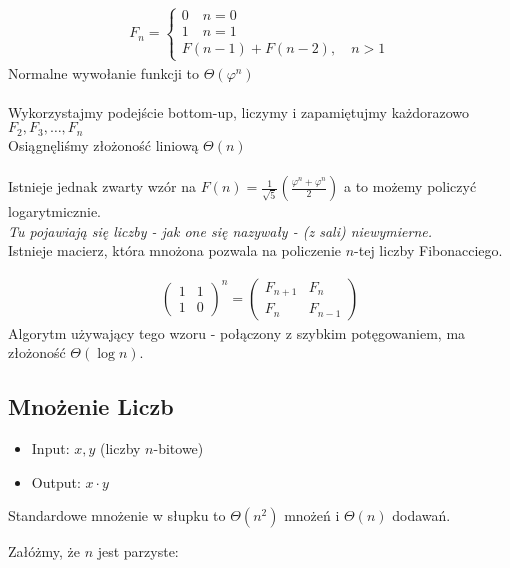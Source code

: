\documentclass{article}
\begin{document}
\begin{align}
    F_n = \begin{cases}
        0 \quad n = 0\\
        1 \quad n = 1\\
        F(n-1) + F(n-2) ,\quad n > 1
    \end{cases}
\end{align}
Normalne wywołanie funkcji to $\Theta(\varphi^n)$\\\\
Wykorzystajmy podejście bottom-up, liczymy i zapamiętujmy każdorazowo $F_2, F_3,\dots, F_n$\\
Osiągnęliśmy złożoność liniową $\Theta(n)$\\\\
Istnieje jednak zwarty wzór na $F(n)=\frac{1}{\sqrt{5}}\left(\frac{\varphi^n + \varphi^n}{2}\right)$
a to możemy policzyć logarytmicznie.\\

\textit{Tu pojawiają się liczby - jak one się nazywały - (z sali) niewymierne.}\\

\noindent
Istnieje macierz, która mnożona pozwala na policzenie $n$-tej liczby Fibonacciego.

\begin{align}
    \begin{pmatrix}
        1 & 1 \\
        1 & 0
    \end{pmatrix}^n =
    \begin{pmatrix}
        F_{n+1} & F_{n} \\
        F_{n} & F_{n-1}
    \end{pmatrix}
\end{align}
Algorytm używający tego wzoru - połączony z szybkim potęgowaniem, ma złożoność $\Theta(\log n)$.

\subsection{Mnożenie Liczb}

\begin{itemize}
    \item Input: $x,y$ (liczby $n$-bitowe)
    \item Output: $x\cdot y$
\end{itemize}
Standardowe mnożenie w słupku to $\Theta(n^2)$ mnożeń i $\Theta(n)$ dodawań.

\noindent
Załóżmy, że $n$ jest parzyste:
\end{document}
